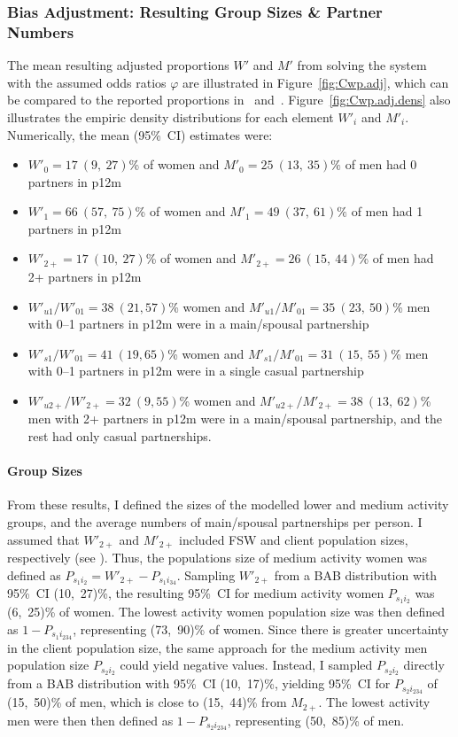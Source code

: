 \subsubsection{Bias Adjustment: Resulting Group Sizes \& Partner Numbers}\label{model.par.nsw.res}
The mean resulting adjusted proportions $W'$ and $M'$
from solving the system with the assumed odds ratios $\varphi$
are illustrated in Figure~\ref{fig:Cwp.adj}, which can be compared to
the reported proportions in ~and~.
Figure~\ref{fig:Cwp.adj.dens} also illustrates the empiric density distributions
for each element $W'_{i}$ and $M'_{i}$.
Numerically, the mean (95\%~CI) estimates were:
\begin{itemize}
  \item $W'_{0} = 17~(9,~27)$\% of women and $M'_{0} = 25~(13,~35)\%$ of men had 0 partners in p12m
  \item $W'_{1} = 66~(57,~75)$\% of women and $M'_{1} = 49~(37,~61)\%$ of men had 1 partners in p12m
  \item $W'_{2+} = 17~(10,~27)$\% of women and $M'_{2+} = 26~(15,~44)$\% of men had 2+ partners in p12m
  \item $W'_{u1} / W'_{01} = 38~(21,57)$\% women and $M'_{u1} / M'_{01} = 35~(23,~50)$\% men
    with 0--1 partners in p12m were in a main/spousal partnership
  \item $W'_{s1} / W'_{01} = 41~(19,65)$\% women and $M'_{s1} / M'_{01} = 31~(15,~55)$\% men
    with 0--1 partners in p12m were in a single casual partnership
  \item $W'_{u2+} / W'_{2+} = 32~(9,55)$\% women and $M'_{u2+} / M'_{2+} = 38~(13,~62)$\% men
    with 2+ partners in p12m were in a main/spousal partnership,
    and the rest had only casual partnerships.
\end{itemize}
\paragraph{Group Sizes}
From these results, I defined the sizes of the modelled lower and medium activity groups,
and the average numbers of main/spousal partnerships per person.
I assumed that $W'_{2+}$ and $M'_{2+}$ included FSW and client population sizes, respectively
(see ).
Thus, the populations size of medium activity women was defined as
$P_{s_{1}i_{2}} = W'_{2+} - P_{s_{1}i_{34}}$.
Sampling $W'_{2+}$ from a BAB distribution with 95\%~CI (10,~27)\%,
the resulting 95\%~CI for medium activity women $P_{s_{1}i_{2}}$ was (6,~25)\% of women.
The lowest activity women population size was then defined as $1 - P_{s_{1}i_{234}}$,
representing (73,~90)\% of women.
Since there is greater uncertainty in the client population size,
the same approach for the medium activity men population size $P_{s_{2}i_{2}}$
could yield negative values.
Instead, I sampled $P_{s_{2}i_{2}}$ directly from
a BAB distribution with 95\%~CI (10,~17)\%, yielding
95\%~CI for $P_{s_{2}i_{234}}$ of (15,~50)\% of men,
which is close to (15,~44)\% from $M_{2+}$.
The lowest activity men were then then defined as $1 - P_{s_{2}i_{234}}$,
representing (50,~85)\% of men.
